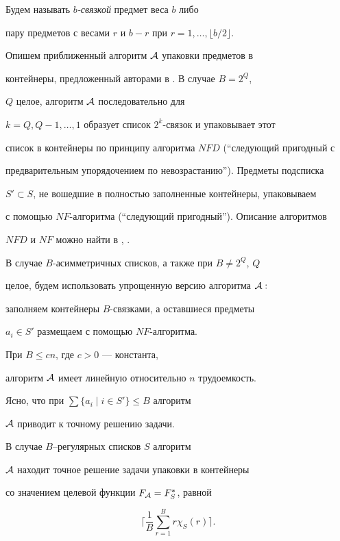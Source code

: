 Будем называть {\em $b$-связкой} предмет веса $b$ либо


пару предметов с весами $r$ и $b-r$ при $r=1,\dotsc,\lfloor b/2 \rfloor$.





Опишем приближенный алгоритм ${\cal A}$ упаковки предметов в


контейнеры, предложенный авторами в \cite{GZ}. В случае $B=2^{Q}$,


$Q$ целое, алгоритм ${\cal A}$ последовательно для


$k=Q,Q-1,\dotsc,1$ образует список $2^{k}$-связок и упаковывает этот


список в контейнеры по принципу алгоритма $NFD$ (``следующий пригодный с


предварительным упорядочением по невозрастанию''). Предметы подсписка


$S'\subset S$, не вошедшие в полностью заполненные контейнеры, упаковываем


с помощью $NF$-алгоритма (``следующий пригодный''). Описание алгоритмов


$NFD$ и $NF$ можно найти в \cite{CGJ}, \cite{JDUGG}.





В случае $B$-асимметричных списков, а также при $B\ne 2^{Q}$, $Q$


целое, будем использовать упрощенную версию алгоритма ${\cal A}:$


заполняем контейнеры $B$-связками, а оставшиеся предметы


$a_{i} \in S'$ размещаем с помощью $NF$-алгоритма.





При $B \le cn$, где $c>0$ --- константа,


алгоритм ${\cal A}$ имеет линейную относительно $n$ трудоемкость.


Ясно, что при $\sum \{a_{i}\mid i \in S'\} \le B$ алгоритм


${\cal A}$  приводит к точному решению задачи.





\begin{lem}


\label{lm2}


В случае $B$--регулярных списков $S$ алгоритм


${\cal A}$ находит точное решение задачи упаковки в контейнеры


со значением целевой функции $F_{{\cal A}}=F_{S}^{\ast}$, равной


$$


\biggl\lceil \frac {1}{B} \sum_{r=1}^{B}r \chi_S(r)


\biggr \rceil .


$$


\end{lem}





